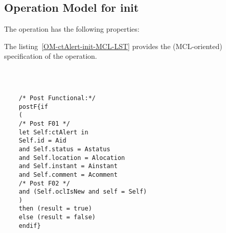 \subsection{Operation Model for init}

\label{OM-init}


The  operation has the following properties:

	\begin{operationmodel}



		


	\end{operationmodel}



	\vspace{1cm}
	The listing~\ref{OM-ctAlert-init-MCL-LST} provides the \msrmessir (MCL-oriented) specification of the operation.
	
	\scriptsize
	\vspace{0.5cm}
	\begin{lstlisting}[style=MessirStyle,firstnumber=auto,captionpos=b,caption={\msrmessir (MCL-oriented) specification of the operation \emph{init}.},label=OM-ctAlert-init-MCL-LST]

	
	
	/* Post Functional:*/ 
	postF{if
	(
	/* Post F01 */
	let Self:ctAlert in
	Self.id = Aid
	and Self.status = Astatus
	and Self.location = Alocation
	and Self.instant = Ainstant
	and Self.comment = Acomment
	/* Post F02 */
	and (Self.oclIsNew and self = Self)
	)
	then (result = true)
	else (result = false)
	endif}
	
	
	\end{lstlisting}
	\normalsize 
	
	
	
	





